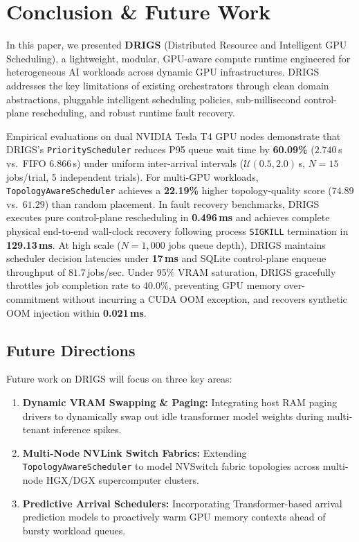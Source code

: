 \section{Conclusion \& Future Work}
\label{sec:conclusion}

In this paper, we presented \textbf{DRIGS} (Distributed Resource and Intelligent GPU Scheduling), a lightweight, modular, GPU-aware compute runtime engineered for heterogeneous AI workloads across dynamic GPU infrastructures. DRIGS addresses the key limitations of existing orchestrators through clean domain abstractions, pluggable intelligent scheduling policies, sub-millisecond control-plane rescheduling, and robust runtime fault recovery.

Empirical evaluations on dual NVIDIA Tesla T4 GPU nodes demonstrate that DRIGS's \texttt{PriorityScheduler} reduces P95 queue wait time by \textbf{60.09\%} ($2.740$\,s vs.\ FIFO $6.866$\,s) under uniform inter-arrival intervals ($\mathcal{U}(0.5,2.0)$\,s, $N=15$ jobs/trial, 5 independent trials). For multi-GPU workloads, \texttt{TopologyAwareScheduler} achieves a \textbf{22.19\%} higher topology-quality score ($74.89$ vs.\ $61.29$) than random placement. In fault recovery benchmarks, DRIGS executes pure control-plane rescheduling in \textbf{0.496\,ms} and achieves complete physical end-to-end wall-clock recovery following process \texttt{SIGKILL} termination in \textbf{129.13\,ms}. At high scale ($N=1,000$ jobs queue depth), DRIGS maintains scheduler decision latencies under \textbf{17\,ms} and SQLite control-plane enqueue throughput of $81.7$\,jobs/sec. Under 95\% VRAM saturation, DRIGS gracefully throttles job completion rate to 40.0\%, preventing GPU memory over-commitment without incurring a CUDA OOM exception, and recovers synthetic OOM injection within \textbf{0.021\,ms}.


\subsection{Future Directions}
Future work on DRIGS will focus on three key areas:
\begin{enumerate}
    \item \textbf{Dynamic VRAM Swapping \& Paging:} Integrating host RAM paging drivers to dynamically swap out idle transformer model weights during multi-tenant inference spikes.
    \item \textbf{Multi-Node NVLink Switch Fabrics:} Extending \texttt{TopologyAwareScheduler} to model NVSwitch fabric topologies across multi-node HGX/DGX supercomputer clusters.
    \item \textbf{Predictive Arrival Schedulers:} Incorporating Transformer-based arrival prediction models to proactively warm GPU memory contexts ahead of bursty workload queues.
\end{enumerate}

